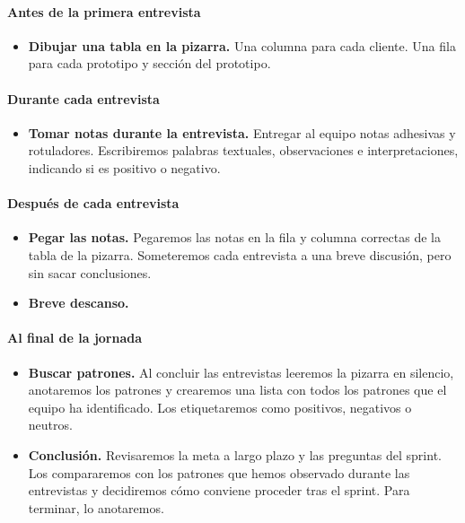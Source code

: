 \documentclass[10pt]{article}
\begin{document}
\begin{multicols}{2}
\paragraph{Antes de la primera entrevista}
\begin{itemize}
\item \textbf{Dibujar una tabla en la pizarra.} Una columna para cada cliente. Una fila para cada prototipo y sección del prototipo.
\end{itemize}
\paragraph{Durante cada entrevista}
\begin{itemize}
\item \textbf{Tomar notas durante la entrevista.} Entregar al equipo notas adhesivas y rotuladores. Escribiremos palabras textuales,
observaciones e interpretaciones, indicando si es positivo o negativo.
\end{itemize}
\paragraph{Después de cada entrevista}
\begin{itemize}
\item \textbf{Pegar las notas.} Pegaremos las notas en la fila y columna correctas de la tabla de la pizarra. Someteremos cada entrevista a una breve discusión, pero sin sacar conclusiones.
\item \textbf{Breve descanso.}
\end{itemize}
\paragraph{Al final de la jornada}
\begin{itemize}
\item \textbf{Buscar patrones.} Al concluir las entrevistas leeremos la pizarra en silencio, anotaremos los patrones y crearemos una lista con todos los patrones que el equipo ha identificado. Los etiquetaremos como positivos, negativos o neutros.
\item \textbf{Conclusión.} Revisaremos la meta a largo plazo y las preguntas del sprint. Los compararemos con los patrones que hemos observado durante las entrevistas y decidiremos cómo conviene proceder tras el sprint. Para terminar, lo anotaremos.
\end{itemize} 
\end{multicols}
\end{document}
